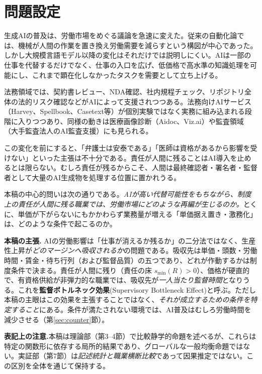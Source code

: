 \documentclass[11pt]{article}
\theoremstyle{plain}
\theoremstyle{definition}
\theoremstyle{remark}
\begin{document}
\section{問題設定}

生成AIの普及は、労働市場をめぐる議論を急速に変えた。従来の自動化論では、機械が人間の作業を置き換え労働需要を減らすという構図が中心であった。しかし大規模言語モデル以降の変化はそれだけでは説明しにくい。AIは一部の仕事を代替するだけでなく、仕事の入口を広げ、低価格で高水準の知識処理を可能にし、これまで顕在化しなかったタスクを需要として立ち上げる。

法務領域では、契約書レビュー、NDA確認、社内規程チェック、リポジトリ全体の法的リスク確認などがAIによって支援されつつある。法務向けAIサービス（Harvey、Spellbook、Casetext等）が個別実験ではなく実務に組み込まれる段階に入りつつあり、同様の動きは医療画像診断（Aidoc、Viz.ai）や監査領域（大手監査法人のAI監査支援）にも見られる。

この変化を前にすると、「弁護士は安泰である」「医師は資格があるから影響を受けない」といった主張は不十分である。責任が人間に残ることはAI導入を止めるとは限らない。むしろ責任が残るからこそ、人間は最終確認者・署名者・監督者として大量のAI生成物を処理する位置に置かれうる。

本稿の中心的問いは次の通りである。\emph{AIが高い代替可能性をもちながら、制度上の責任が人間に残る職業では、労働市場にどのような再編が生じるのか。}とくに、単価が下がらないにもかかわらず業務量が増える「単価据え置き・激務化」は、どのような条件で起こるのか。

\begin{claimbox}
\textbf{本稿の主張.} AIの労働影響は「仕事が消えるか残るか」の二分法ではなく、生産性上昇が\emph{どのマージンへ吸収されるか}の問題である。吸収先は単価・頭数・労働時間・賃金・待ち行列（および監督品質）の五つであり、どれが作動するかは制度条件で決まる。責任が人間に残り（責任の床 $s_{\min}(R)>0$）、価格が硬直的で、有資格供給が非弾力的な職業では、吸収先が\emph{一人当たり監督時間}となりうる。これを\textbf{監督ボトルネック効果}(Supervisory Bottleneck Effect)と呼ぶ。ただし本稿の主眼はこの効果を主張することではなく、\emph{それが成立するための条件を特定すること}にある。条件が満たされない環境では、AI普及はむしろ労働時間を減少させる（第\ref{sec:counter}節）。
\end{claimbox}

\noindent\textbf{表記上の注意.}\quad 本稿は理論部（第3--4節）で比較静学的命題を述べるが、これらは特定の関数形に依存する局所的結果であり、グローバルな一般均衡命題ではない。実証部（第7節）は\emph{記述統計と職業横断比較}であって因果推定ではない。この区別を全体を通じて保持する。
\end{document}
